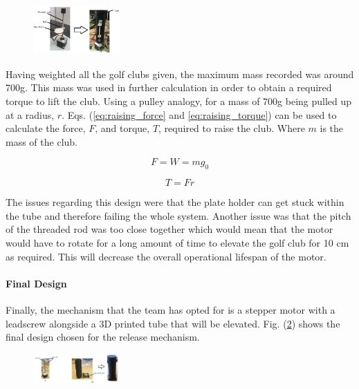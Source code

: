 \documentclass[11pt,landscape]{article}
\begin{document}
\begin{multicols}{3}
\begin{figure}[H]
    \begin{center}
        \includegraphics[width=0.3\textwidth]{Init stepper motor design.PNG}
        \label{fig:init_stepper}
    \end{center}
\end{figure}

Having weighted all the golf clubs given, the maximum mass recorded was around
700g. This mass was used in further calculation in order to obtain a required
torque to lift the club. Using a pulley analogy, for a mass of 700g being pulled
up at a radius, $r$. Eqs. (\ref{eq:raising_force} and \ref{eq:raising_torque}) 
can be used to calculate the force, $F$, and
torque, $T$, required to raise the club. Where $m$ is the mass of the club.
\begin{center}
    \begin{equation}
        F = W = mg_0
        \label{eq:raising_force}
    \end{equation}
\end{center}
\begin{center}
    \begin{equation}
        T = Fr
        \label{eq:raising_torque}
    \end{equation}
\end{center}The issues regarding this design were that the plate holder can get
stuck within the tube and therefore failing the whole system. Another issue was
that the pitch of the threaded rod was too close together which would mean that
the motor would have to rotate for a long amount of time to elevate the golf
club for 10 cm as required. This will decrease the overall operational lifespan
of the motor.

\paragraph{Final Design}
Finally, the mechanism that the team has opted for is a stepper motor with a
leadscrew alongside a 3D printed tube that will be elevated. Fig.
(\ref{fig:final_stepper}) shows the final design chosen for the release
mechanism.
\begin{figure}[H]
    \begin{center}
        \includegraphics[width=0.3\textwidth]{Final Stepper motor design.PNG}
        \label{fig:final_stepper}
    \end{center}
\end{figure}


\end{multicols}
\end{document}

